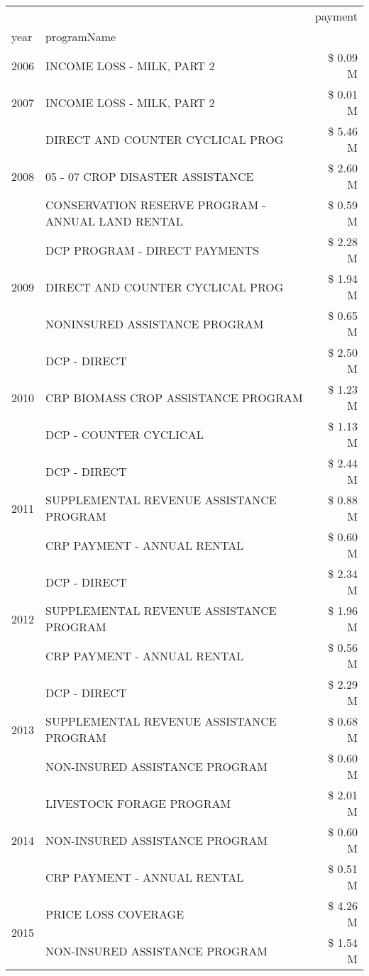 \begin{tabular}{llr}
\toprule
 &  & payment \\
year & programName &  \\
\midrule
2006 & INCOME LOSS - MILK, PART 2 & \$ 0.09 M \\
\cline{1-3}
2007 & INCOME LOSS - MILK, PART 2 & \$ 0.01 M \\
\cline{1-3}
\multirow[t]{3}{*}{2008} & DIRECT AND COUNTER CYCLICAL PROG & \$ 5.46 M \\
 & 05 - 07 CROP DISASTER ASSISTANCE & \$ 2.60 M \\
 & CONSERVATION RESERVE PROGRAM - ANNUAL LAND RENTAL & \$ 0.59 M \\
\cline{1-3}
\multirow[t]{3}{*}{2009} & DCP PROGRAM - DIRECT PAYMENTS & \$ 2.28 M \\
 & DIRECT AND COUNTER CYCLICAL PROG & \$ 1.94 M \\
 & NONINSURED ASSISTANCE PROGRAM & \$ 0.65 M \\
\cline{1-3}
\multirow[t]{3}{*}{2010} & DCP - DIRECT & \$ 2.50 M \\
 & CRP BIOMASS CROP ASSISTANCE PROGRAM & \$ 1.23 M \\
 & DCP - COUNTER CYCLICAL & \$ 1.13 M \\
\cline{1-3}
\multirow[t]{3}{*}{2011} & DCP - DIRECT & \$ 2.44 M \\
 & SUPPLEMENTAL REVENUE ASSISTANCE PROGRAM & \$ 0.88 M \\
 & CRP PAYMENT - ANNUAL RENTAL & \$ 0.60 M \\
\cline{1-3}
\multirow[t]{3}{*}{2012} & DCP - DIRECT & \$ 2.34 M \\
 & SUPPLEMENTAL REVENUE ASSISTANCE PROGRAM & \$ 1.96 M \\
 & CRP PAYMENT - ANNUAL RENTAL & \$ 0.56 M \\
\cline{1-3}
\multirow[t]{3}{*}{2013} & DCP - DIRECT & \$ 2.29 M \\
 & SUPPLEMENTAL REVENUE ASSISTANCE PROGRAM & \$ 0.68 M \\
 & NON-INSURED ASSISTANCE PROGRAM & \$ 0.60 M \\
\cline{1-3}
\multirow[t]{3}{*}{2014} & LIVESTOCK FORAGE PROGRAM & \$ 2.01 M \\
 & NON-INSURED ASSISTANCE PROGRAM & \$ 0.60 M \\
 & CRP PAYMENT - ANNUAL RENTAL & \$ 0.51 M \\
\cline{1-3}
\multirow[t]{3}{*}{2015} & PRICE LOSS COVERAGE & \$ 4.26 M \\
 & NON-INSURED ASSISTANCE PROGRAM & \$ 1.54 M \\

\end{tabular}
